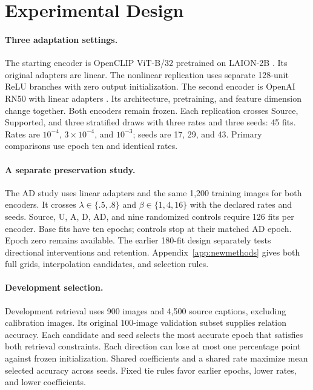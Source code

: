 \section{Experimental Design}
\label{sec:newexperiments}
\paragraph{Three adaptation settings.}
The starting encoder is OpenCLIP ViT-B/32 pretrained on LAION-2B \citep{cherti2023reproducible}.
Its original adapters are linear.
The nonlinear replication uses separate 128-unit ReLU branches with zero output initialization.
The second encoder is OpenAI RN50 with linear adapters \citep{radford2021clip}.
Its architecture, pretraining, and feature dimension change together.
Both encoders remain frozen.
Each replication crosses Source, Supported, and three stratified draws with three rates and three seeds: 45 fits.
Rates are $10^{-4}$, $3\times10^{-4}$, and $10^{-3}$; seeds are 17, 29, and 43.
Primary comparisons use epoch ten and identical rates.

\paragraph{A separate preservation study.}
The AD study uses linear adapters and the same 1,200 training images for both encoders.
It crosses $\lambda\in\{.5,.8\}$ and $\beta\in\{1,4,16\}$ with the declared rates and seeds.
Source, U, A, D, AD, and nine randomized controls require 126 fits per encoder.
Base fits have ten epochs; controls stop at their matched AD epoch.
Epoch zero remains available.
The earlier 180-fit design separately tests directional interventions and retention.
Appendix~\ref{app:newmethods} gives both full grids, interpolation candidates, and selection rules.

\paragraph{Development selection.}
Development retrieval uses 900 images and 4,500 source captions, excluding calibration images.
Its original 100-image validation subset supplies relation accuracy.
Each candidate and seed selects the most accurate epoch that satisfies both retrieval constraints.
Each direction can lose at most one percentage point against frozen initialization.
Shared coefficients and a shared rate maximize mean selected accuracy across seeds.
Fixed tie rules favor earlier epochs, lower rates, and lower coefficients.

